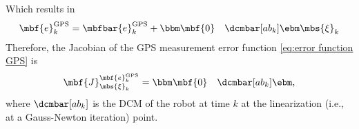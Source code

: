 \documentclass[ nobib, nofonts, notoc]{tufte-handout}
\begin{document}
    Which results in
    \begin{align}
      \mbf{e}^{\mathrm{GPS}}_{k}
      &=
      \mbfbar{e}^{\mathrm{GPS}}_{k}
      +
      \bbm
        \mbf{0} & \dcmbar[ab_{k}]
      \ebm
      \mbs{\xi}_{k}
    \end{align}
    Therefore, the Jacobian of the GPS measurement error function \eqref{eq:error function GPS} is
    \begin{align}
      \mbf{J}^{
          \mbf{e}^{\mathrm{GPS}}_{k}
       }_{\mbs{\xi}_{k}}
       &=
       \bbm
         \mbf{0} &
         \dcmbar[ab_{k}]
       \ebm,
    \end{align}
    where $\dcmbar[ab_{k}]$ is the DCM of the robot at time $k$ at the linearization (i.e., at a Gauss-Newton iteration) point.

    \clearpage
    
    
\end{document}
